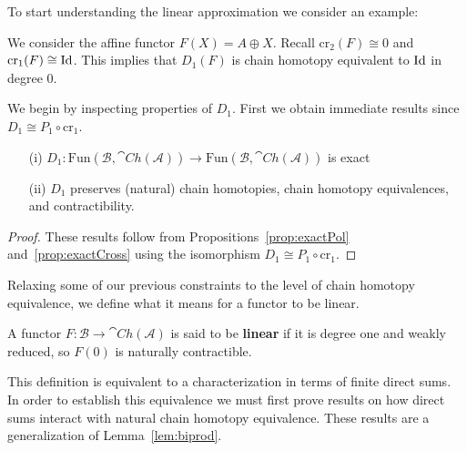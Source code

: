 To start understanding the linear approximation we consider an example:

\begin{eg}{}
    We consider the affine functor $F(X) = A\oplus X$. Recall $\text{cr}_2(F) \cong 0$ and $\text{cr}_1(F) \cong \operatorname{Id}$. This implies that $D_1(F)$ is chain homotopy equivalent to $\operatorname{Id}$ in degree $0$.
\end{eg}

We begin by inspecting properties of $D_1$. First we obtain immediate results since $D_1\cong P_1\circ \text{cr}_1$.

\begin{prop}[label=prop:D1Exact]
    \begin{itemize}
        \item[(i)] $D_1:\text{Fun}(\mathcal{B},\cat{Ch}(\mathcal{A}))\to \text{Fun}(\mathcal{B},\cat{Ch}(\mathcal{A}))$ is exact
        \item[(ii)] $D_1$ preserves (natural) chain homotopies, chain homotopy equivalences, and contractibility.
    \end{itemize}
\end{prop}
\begin{proof}
    These results follow from Propositions~\ref{prop:exactPol} and~\ref{prop:exactCross} using the isomorphism $D_1\cong P_1\circ \text{cr}_1$.
\end{proof}

Relaxing some of our previous constraints to the level of  chain homotopy equivalence, we define what it means for a functor to be linear.

\begin{defn}[label=defn:linear]
    A functor $F:\mathcal{B}\to \cat{Ch}(\mathcal{A})$ is said to be \textbf{linear} if it is degree one and weakly reduced, so $F(0)$ is naturally contractible.
\end{defn}

This definition is equivalent to a characterization in terms of finite direct sums. In order to establish this equivalence we must first prove results on how direct sums interact with natural chain homotopy equivalence. These results are a generalization of Lemma~\ref{lem:biprod}.

